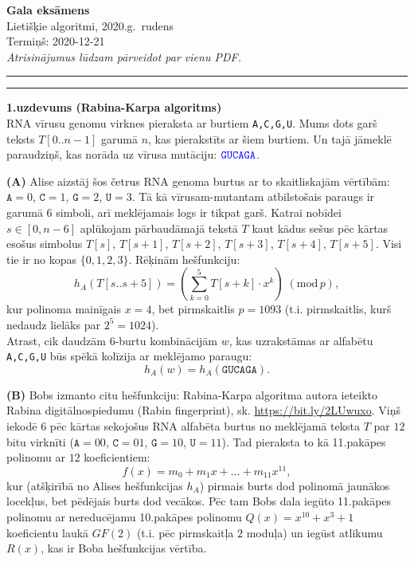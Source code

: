 \documentclass[a4paper,12pt]{article}
\begin{document}
\thispagestyle{empty}

\begin{center}
{\bf\Huge Gala eksāmens} \\[5pt]
Lietišķie algoritmi, 2020.g.\ rudens \\
Termiņš: 2020-12-21\\[5pt]
{\em Atrisinājumus lūdzam pārveidot par vienu PDF.}
\end{center}

\hrule
\vspace{2pt}
\hrule
\vspace{12pt}



\vspace{5pt}
{\bf 1.uzdevums (Rabina-Karpa algoritms)}\\
RNA vīrusu genomu virknes pieraksta ar burtiem {\tt A,C,G,U}.
Mums dots garš teksts $T[0..n-1]$ garumā $n$, kas pierakstīts ar 
šiem burtiem. Un tajā jāmeklē paraudziņš, kas norāda uz 
vīrusa mutāciju: $\textcolor{blue}{\mathtt{GUCAGA}}$. 

\vspace{5pt}
{\bf (A)} Alise aizstāj šos četrus RNA genoma burtus ar to skaitliskajām 
vērtībām: $\mathtt{A} = 0$, $\mathtt{C} = 1$, $\mathtt{G} = 2$, 
$\mathtt{U} = 3$. Tā kā vīrusam-mutantam atbilstošais paraugs ir garumā $6$ simboli, 
arī meklējamais logs ir tikpat garš. Katrai nobīdei $s \in [0,n-6]$ 
aplūkojam pārbaudāmajā tekstā $T$ kaut kādus sešus pēc kārtas esošus simbolus 
$T[s]$, $T[s+1]$, $T[s+2]$, $T[s+3]$, $T[s+4]$, $T[s+5]$. 
Visi tie ir no kopas $\{ 0,1,2,3 \}$. Rēķinām hešfunkciju: 
$$h_A(T[s..s+5]) = \left( \sum\limits_{k=0}^{5} T[s+k] \cdot x^k \right)\;(\text{mod}\,p),$$
kur polinoma mainīgais $x = 4$, bet pirmskaitlis $p = 1093$
(t.i. pirmskaitlis, kurš nedaudz lielāks par $2^5 = 1024$).\\


Atrast, cik daudzām $6$-burtu kombinācijām $w$, kas uzrakstāmas ar 
alfabētu {\tt A,C,G,U} būs spēkā kolīzija ar meklējamo paraugu:
$$h_A(w) = h_A(\mathtt{GUCAGA}).$$



\vspace{5pt}
{\bf (B)}
Bobs izmanto citu hešfunkciju: Rabina-Karpa algoritma 
autora ieteikto Rabina digitālnospiedumu 
(Rabin fingerprint), sk. \url{https://bit.ly/2LUwuxo}. 
Viņš iekodē $6$ pēc kārtas sekojošus RNA alfabēta burtus no 
meklējamā teksta $T$ par $12$ bitu virknīti
($\mathtt{A} = 00$, $\mathtt{C} = 01$, $\mathtt{G} = 10$, $\mathtt{U} = 11$). 
Tad pieraksta to kā 11.pakāpes polinomu ar $12$ koeficientiem: 
$$f(x) = m_0 + m_1 x + \ldots + m_{11} x^{11},$$
kur (atšķirībā no Alises hešfunkcijas $h_A$) pirmais burts dod polinomā jaunākos 
locekļus, bet pēdējais burts dod vecākos. 
Pēc tam Bobs dala iegūto 11.pakāpes polinomu ar nereducējamu 
10.pakāpes polinomu $Q(x) = x^{10} + x^3 + 1$ koeficientu laukā $GF(2)$
(t.i. pēc pirmskaitļa $2$ moduļa) un iegūst atlikumu 
$R(x)$, kas ir Boba hešfunkcijas vērtība. 
\end{document}

